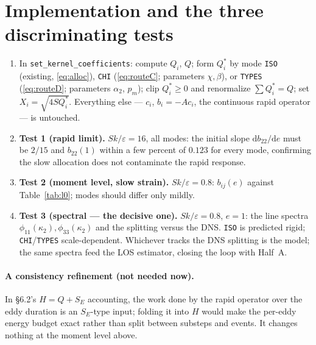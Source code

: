 \documentclass[11pt,a4paper]{article}
\newcommand{\Qs}{Q^{*}}
\begin{document}
\section{Implementation and the three discriminating tests}

\begin{enumerate}[leftmargin=2em]
\item In \texttt{set\_kernel\_coefficients}: compute $Q_i$, $Q$; form
  $\Qs_i$ by mode \texttt{ISO} (existing, \eqref{eq:alloc}),
  \texttt{CHI} (\eqref{eq:routeC}; parameters $\chi,\beta$), or
  \texttt{TYPES} (\eqref{eq:routeD}; parameters $\alpha_2$, $p_m$); clip
  $\Qs_i\ge0$ and renormalize $\sum\Qs_i=Q$; set $X_i=\sqrt{4S\Qs_i}$.
  Everything else --- $c_i$, $b_i=-Ac_i$, the continuous rapid operator ---
  is untouched.
\item \textbf{Test 1 (rapid limit).} $Sk/\varepsilon=16$, all modes: the
  initial slope $\mathrm db_{22}/\mathrm de$ must be $2/15$ and $b_{22}(1)$
  within a few percent of $0.123$ for every mode, confirming the slow
  allocation does not contaminate the rapid response.
\item \textbf{Test 2 (moment level, slow strain).} $Sk/\varepsilon=0.8$:
  $b_{ij}(e)$ against Table~\ref{tab:l0}; modes should differ only mildly.
\item \textbf{Test 3 (spectral --- the decisive one).} $Sk/\varepsilon=0.8$,
  $e=1$: the line spectra $\phi_{11}(\kappa_2),\phi_{33}(\kappa_2)$ and the
  splitting versus the DNS. \texttt{ISO} is predicted rigid;
  \texttt{CHI}/\texttt{TYPES} scale-dependent. Whichever tracks the DNS
  splitting is the model; the same spectra feed the LOS estimator, closing
  the loop with Half~A.
\end{enumerate}

\paragraph{A consistency refinement (not needed now).} In \S6.2's
$H=Q+S_E$ accounting, the work done by the rapid operator over the eddy
duration is an $S_E$-type input; folding it into $H$ would make the
per-eddy energy budget exact rather than split between substeps and
events. It changes nothing at the moment level above.
\end{document}

